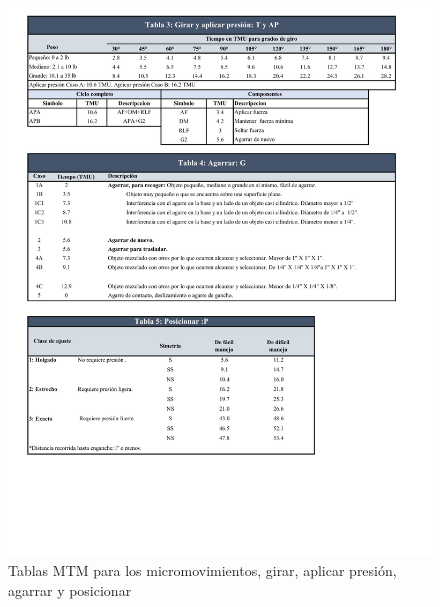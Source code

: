     
    \begin{figure}[H]
        \centering
        \includegraphics[trim = {7mm 40mm 10mm 5mm},clip,scale=0.35]{22/Img/tablasMTM2.pdf}
        \caption{Tablas MTM para los micromovimientos, girar, aplicar presión, agarrar y posicionar}
        \label{tablaMTM2}
    \end{figure}
    
